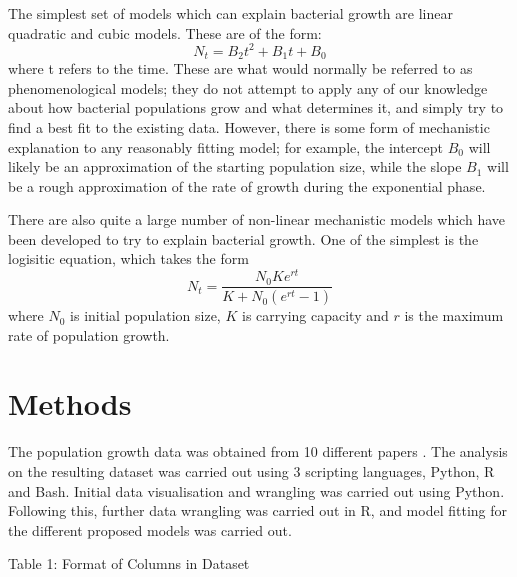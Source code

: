 \documentclass[11pt,a4wide,titlepage]{article}
\begin{document}
The simplest set of models which can explain bacterial growth are linear quadratic and cubic models. These are of the form: 
\[N_t = B_2t^2 + B_1t + B_0\]
where t refers to the time. These are what would normally be referred to as phenomenological models; they do not attempt to apply any of our knowledge about how bacterial populations grow and what determines it, and simply try to find a best fit to the existing data. However, there is some form of mechanistic explanation to any reasonably fitting model; for example, the intercept $B_0$ will likely be an approximation of the starting population size, while the slope $B_1$ will be a rough approximation of the rate of growth during the exponential phase.

There are also quite a large number of non-linear mechanistic models which have been developed to try to explain bacterial growth. One of the simplest is the logisitic equation, which takes the form
\[N_t = \frac{N_0Ke^{rt}}{K + N_0(e^{rt} - 1)}\]
where $N_0$ is initial population size, $K$ is carrying capacity and $r$ is the maximum rate of population growth.

\section*{Methods}
The population growth data was obtained from 10 different papers \citep{baeGrowthCharacteristicsBiofilm2014a,bernhardtMetabolicTheoryTemperatureSize2018,galarzPredictingBacterialGrowth2016,gillGrowthEscherichiaColi1991,phillipsRelationTemperatureGrowth1987,rothContinuityPsychrophilicMesophilic1962,silvaModellingGrowthLactic2018,sivonenEffectsLightTemperature1990,stannardTemperatureGrowthRelationships1985,zwieteringModelingBacterialGrowth1994}. The analysis on the resulting dataset was carried out using 3 scripting languages, Python, R and Bash. Initial data visualisation and wrangling was carried out using Python. Following this, further data wrangling was carried out in R, and model fitting for the different proposed models was carried out.\newline

\begin{center}
	Table 1: Format of Columns in Dataset \newline
	\newline
\end{center}
\end{document}
